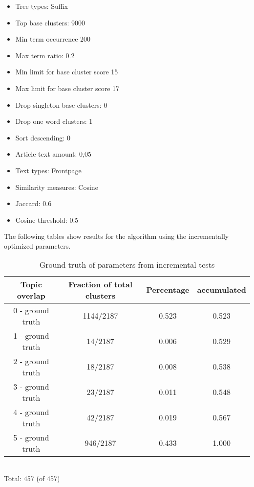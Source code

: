 \begin{itemize}
  \item Tree types: Suffix
  \item Top base clusters: 9000
  \item Min term occurrence 200
  \item Max term ratio: 0.2
  \item Min limit for base cluster score 15
  \item Max limit for base cluster score 17
  \item Drop singleton base clusters: 0
  \item Drop one word clusters: 1
  \item Sort descending: 0
  \item Article text amount: 0,05
  \item Text types: Frontpage
  \item Similarity measures: Cosine
  \item Jaccard: 0.6
  \item Cosine threshold: 0.5
\end{itemize}

The following tables show results for the \CTC algorithm using the incrementally optimized parameters.

\begin{table}
\begin{center}
\begin{tabular}{|c|c|c|c|}
\hline
Topic overlap &  Fraction of total clusters & Percentage  & accumulated\\ 
\hline
0 - ground truth & 1144/2187 & 0.523 & 0.523 \\
1 - ground truth & 14/2187 & 0.006 & 0.529 \\
2 - ground truth & 18/2187 & 0.008 & 0.538\\
3 - ground truth & 23/2187 & 0.011 & 0.548\\
4 - ground truth & 42/2187 & 0.019 & 0.567\\
5 - ground truth & 946/2187 & 0.433 & 1.000\\
\hline
\end{tabular}
\\Total: 457 (of  457)
\end{center}
\caption{Ground truth of parameters from incremental tests}
\label{tab:incrementalparametersgroundtruth}
\end{table}


